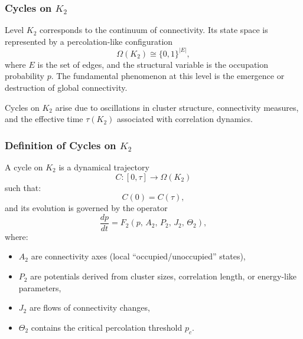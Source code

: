 
\subsubsection{Cycles on \texorpdfstring{$K_2$}{K_2}}
\label{sec:cycles-k2}

Level $K_2$ corresponds to the continuum of connectivity.
Its state space is represented by a percolation-like configuration
\[
  \Omega(K_2) \cong \{0,1\}^{|E|},
\]
where $E$ is the set of edges, and the structural variable is the
occupation probability $p$.
The fundamental phenomenon at this level is the emergence or destruction
of global connectivity.

Cycles on $K_2$ arise due to oscillations in cluster structure, 
connectivity measures, and the effective time $\tau(K_2)$ associated
with correlation dynamics.

\subsubsection{Definition of Cycles on \texorpdfstring{$K_2$}{K_2}}

A cycle on $K_2$ is a dynamical trajectory
\[
  C:[0,\tau]\to\Omega(K_2)
\]
such that:
\[
  C(0)=C(\tau),
\]
and its evolution is governed by the operator
\[
  \frac{dp}{dt}
  = F_2(p,\, A_2,\, P_2,\, J_2,\, \Theta_2),
\]
where:

\begin{itemize}
  \item $A_2$ are connectivity axes (local ``occupied/unoccupied'' states),
  \item $P_2$ are potentials derived from cluster sizes, correlation length,
        or energy-like parameters,
  \item $J_2$ are flows of connectivity changes,
  \item $\Theta_2$ contains the critical percolation threshold $p_c$.
\end{itemize}

